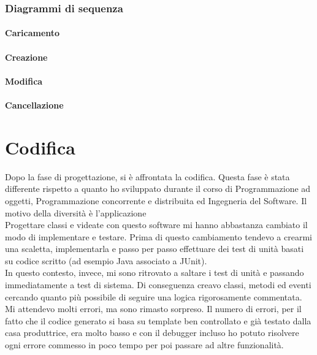 
\subsubsection{Diagrammi di sequenza}

\paragraph{Caricamento}
\paragraph{Creazione}
\paragraph{Modifica}
\paragraph{Cancellazione}


\section{Codifica}
Dopo la fase di progettazione, si è affrontata la codifica. Questa fase è stata differente rispetto a quanto ho sviluppato durante il corso di Programmazione ad oggetti, Programmazione concorrente e distribuita ed Ingegneria del Software. Il motivo della diversità è l'applicazione \inde\.\\
Progettare classi e videate con questo software mi hanno abbastanza cambiato il modo di implementare e testare. Prima di questo cambiamento tendevo a crearmi una scaletta, implementarla e passo per passo effettuare dei test di unità basati su codice scritto (ad esempio Java associato a JUnit).\\
In questo contesto, invece, mi sono ritrovato a saltare i test di unità e passando immediatamente a test di sistema. Di conseguenza creavo classi, metodi ed eventi cercando quanto più possibile di seguire una logica rigorosamente commentata. Mi attendevo molti errori, ma sono rimasto sorpreso. Il numero di errori, per il fatto che il codice generato si basa su template ben controllato e già testato dalla casa produttrice, era molto basso e con il debugger incluso ho potuto risolvere ogni errore commesso in poco tempo per poi passare ad altre funzionalità.

